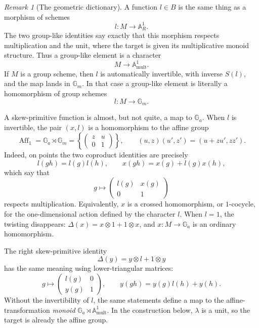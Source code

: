 \documentclass[11pt]{amsart}
\theoremstyle{definition}
\theoremstyle{remark}
\newtheorem{remark}[theorem]{Remark}
\newcommand{\Ga}{\mathbb G_a}
\newcommand{\Gm}{\mathbb G_m}
\newcommand{\ot}{\otimes}
\begin{document}
\begin{remark}[The geometric dictionary]\label{rem:geometric-dictionary}
A function \(l\in B\) is the same thing as a morphism of schemes
\[
 l\colon M\longrightarrow\mathbb A^1_R.
\]
The two group-like identities say exactly that this morphism respects
multiplication and the unit, where the target is given its multiplicative
monoid structure.  Thus a group-like element is a character
\[
 M\longrightarrow\mathbb A^1_{\mathrm{mult}}.
\]
If \(M\) is a group scheme, then \(l\) is automatically invertible, with
inverse \(S(l)\), and the map lands in \(\Gm\).  In that case a group-like
element is literally a homomorphism of group schemes
\[
 l\colon M\longrightarrow\Gm.
\]

A skew-primitive function is almost, but not quite, a map to \(\Ga\).
When \(l\) is invertible, the pair \((x,l)\) is a homomorphism to the
affine group
\begin{equation}\label{eq:affine-group}
 \operatorname{Aff}_1=\Ga\rtimes\Gm
 =
 \left\{
 \begin{pmatrix}z&u\\0&1\end{pmatrix}
 \right\},
 \qquad
 (u,z)(u',z')=(u+zu',zz').
\end{equation}
Indeed, on points the two coproduct identities are precisely
\begin{equation}\label{eq:skew-primitive-on-points}
 l(gh)=l(g)l(h),
 \qquad
 x(gh)=x(g)+l(g)x(h),
\end{equation}
which say that
\[
 g\longmapsto
 \begin{pmatrix}l(g)&x(g)\\0&1\end{pmatrix}
\]
respects multiplication.  Equivalently, \(x\) is a crossed homomorphism,
or \(1\)-cocycle, for the one-dimensional action defined by the character
\(l\).  When \(l=1\), the twisting disappears:
\(\Delta(x)=x\ot1+1\ot x\), and \(x\colon M\to\Ga\) is an ordinary
homomorphism.

The right skew-primitive identity
\[
 \Delta(y)=y\ot l+1\ot y
\]
has the same meaning using lower-triangular matrices:
\[
 g\longmapsto
 \begin{pmatrix}l(g)&0\\y(g)&1\end{pmatrix},
 \qquad
 y(gh)=y(g)l(h)+y(h).
\]
Without the invertibility of \(l\), the same statements define a map to
the affine-transformation \emph{monoid}
\(\Ga\rtimes\mathbb A^1_{\mathrm{mult}}\).  In the construction below,
\(\lambda\) is a unit, so the target is already the affine group.
\end{remark}
\end{document}

